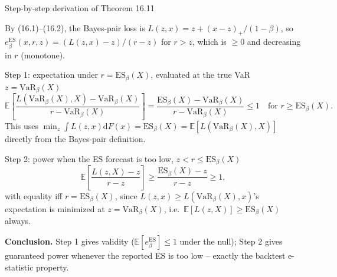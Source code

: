 \documentclass[aspectratio=169,10pt]{beamer}
\newcommand{\EE}{\mathbb{E}}
\newcommand{\1}{\mathbb{1}}
\begin{document}
\begin{frame}{Step-by-step derivation of Theorem 16.11}

By (16.1)--(16.2), the Bayes-pair loss is $L(z,x) = z + (x-z)_+/(1-\beta)$, so $e^{\mathrm{ES}}_\beta(x,r,z) = (L(z,x)-z)/(r-z)$ for $r>z$, which is $\ge 0$ and decreasing in $r$ (monotone).

\begin{block}{Step 1: expectation under $r = \mathrm{ES}_\beta(X)$, evaluated at the true VaR $z=\mathrm{VaR}_\beta(X)$}
\[
\EE\left[ \frac{L(\mathrm{VaR}_\beta(X),X) - \mathrm{VaR}_\beta(X)}{r - \mathrm{VaR}_\beta(X)} \right] = \frac{\mathrm{ES}_\beta(X)-\mathrm{VaR}_\beta(X)}{r-\mathrm{VaR}_\beta(X)} \le 1 \quad \text{for } r \ge \mathrm{ES}_\beta(X).
\]
This uses $\min_z \int L(z,x)\mathrm dF(x) = \mathrm{ES}_\beta(X) = \EE[L(\mathrm{VaR}_\beta(X),X)]$ directly from the Bayes-pair definition.
\end{block}

\begin{block}{Step 2: power when the ES forecast is too low, $z < r \le \mathrm{ES}_\beta(X)$}
\[
\EE\left[\frac{L(z,X)-z}{r-z}\right] \ge \frac{\mathrm{ES}_\beta(X)-z}{r-z} \ge 1,
\]
with equality iff $r = \mathrm{ES}_\beta(X)$, since $L(z,x) \ge L(\mathrm{VaR}_\beta(X),x)$'s expectation is minimized at $z=\mathrm{VaR}_\beta(X)$, i.e.\ $\EE[L(z,X)] \ge \mathrm{ES}_\beta(X)$ always.
\end{block}

\textbf{Conclusion.} Step 1 gives validity ($\EE[e^{\mathrm{ES}}_\beta]\le 1$ under the null); Step 2 gives guaranteed power whenever the reported ES is too low -- exactly the backtest e-statistic property.

\end{frame}
\end{document}

